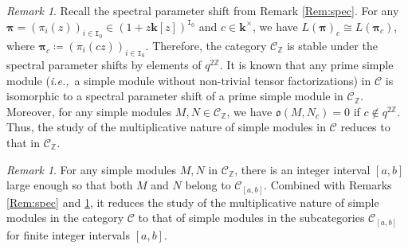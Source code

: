 \documentclass[12pt]{amsart}
\theoremstyle{definition}
\theoremstyle{remark}
\newtheorem{remark}[theorem]{Remark}
\numberwithin{equation}{section}
\newcommand{\ie}{\textit{i.e.,}\ }
\begin{document}
\begin{remark}\label{Rem:CZ}
Recall the spectral parameter shift from Remark \ref{Rem:spec}.
For any $\boldsymbol{\pi} = (\pi_i(z))_{i\in \mathtt I_0} \in (1+z\mathbf{k}[z])^{\mathtt{I}_0}$ and $c \in \mathbf{k}^\times$, we have $L(\boldsymbol{\pi})_c \cong L(\boldsymbol{\pi}_c)$, where $\boldsymbol{\pi}_c \coloneqq (\pi_i(cz))_{i \in \mathtt{I}_0}$. 
Therefore, the category $\mathcal{C}_\mathbb{Z}$ is stable under the spectral parameter shifts by elements of $q^{2\mathbb{Z}}$.
It is known that any prime simple module (\ie a simple module without non-trivial tensor factorizations) in $\mathscr{C}$ is isomorphic to a spectral parameter shift of a prime simple module in $\mathcal{C}_\mathbb{Z}$. 
Moreover, for any simple modules $M,N \in \mathcal{C}_\mathbb{Z}$, we have
$\mathfrak{o}(M,N_c) = 0$ if $c \not \in q^{2\mathbb{Z}}$.   
Thus, the study of the multiplicative nature of simple modules in $\mathscr{C}$ reduces to that in $\mathcal{C}_\mathbb{Z}$.
\end{remark}

\begin{remark}
For any simple modules $M,N$ in $\mathcal{C}_\mathbb{Z}$, there is an integer interval $[a,b]$ large enough so that both $M$ and $N$ belong to $\mathcal{C}_{[a,b]}$.
Combined with Remarks \ref{Rem:spec} and \ref{Rem:CZ}, it reduces the study of the multiplicative nature of simple modules in the category $\mathscr{C}$ to that of simple modules in the subcategories $\mathcal{C}_{[a,b]}$ for finite integer intervals $[a,b]$.   
\end{remark}
\end{document}
